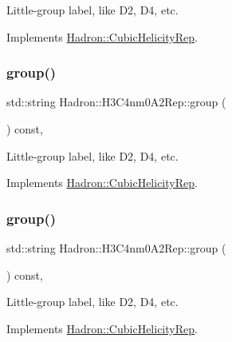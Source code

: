 Little-\/group label, like D2, D4, etc. 

Implements \mbox{\hyperlink{structHadron_1_1CubicHelicityRep_a101a7d76cd8ccdad0f272db44b766113}{Hadron\+::\+Cubic\+Helicity\+Rep}}.

\mbox{\label{structHadron_1_1H3C4nm0A2Rep_a645f15ec66163ba3a04123eb5456f42d}} 
\subsubsection{\texorpdfstring{group()}{group()}\hspace{0.1cm}{\footnotesize\ttfamily [2/3]}}
{\footnotesize\ttfamily std\+::string Hadron\+::\+H3\+C4nm0\+A2\+Rep\+::group (\begin{DoxyParamCaption}{ }\end{DoxyParamCaption}) const\hspace{0.3cm}{\ttfamily [inline]}, {\ttfamily [virtual]}}

Little-\/group label, like D2, D4, etc. 

Implements \mbox{\hyperlink{structHadron_1_1CubicHelicityRep_a101a7d76cd8ccdad0f272db44b766113}{Hadron\+::\+Cubic\+Helicity\+Rep}}.

\mbox{\label{structHadron_1_1H3C4nm0A2Rep_a645f15ec66163ba3a04123eb5456f42d}} 
\subsubsection{\texorpdfstring{group()}{group()}\hspace{0.1cm}{\footnotesize\ttfamily [3/3]}}
{\footnotesize\ttfamily std\+::string Hadron\+::\+H3\+C4nm0\+A2\+Rep\+::group (\begin{DoxyParamCaption}{ }\end{DoxyParamCaption}) const\hspace{0.3cm}{\ttfamily [inline]}, {\ttfamily [virtual]}}

Little-\/group label, like D2, D4, etc. 

Implements \mbox{\hyperlink{structHadron_1_1CubicHelicityRep_a101a7d76cd8ccdad0f272db44b766113}{Hadron\+::\+Cubic\+Helicity\+Rep}}.

